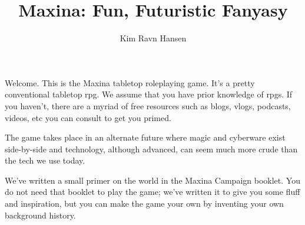 \documentclass[
a4paper,
11pt,
twoside,
openany
]{memoir}
\date{} %
\title{Maxina: Fun, Futuristic Fanyasy}
\author{Kim Ravn Hansen}
\begin{document}
\maketitle

\tableofcontents

\newpage

Welcome. This is the Maxina tabletop roleplaying game. It’s a
pretty conventional tabletop rpg. We assume that you have prior knowledge of
rpgs. If you haven’t, there are a myriad of free resources such as blogs,
vlogs, podcasts, videos, etc you can consult to get you primed.

The game takes place in an alternate future where magic and cyberware exist
side-by-side and technology, although advanced, can seem much more crude than
the tech we use today. 

We’ve written a small primer on the world in the Maxina Campaign booklet. You
do not need that booklet to play the game; we’ve written it to give you some
fluff and inspiration, but you can make the game your own by inventing your own
background history. 




\appendix
\end{document}
